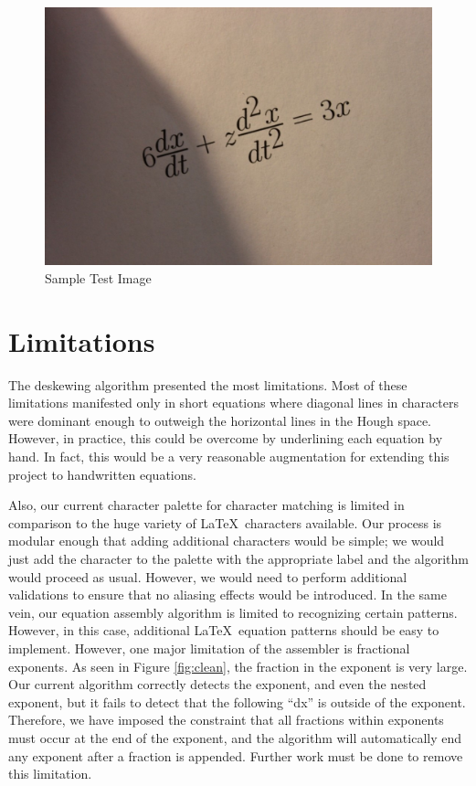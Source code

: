 \documentclass[journal]{IEEEtran}
\begin{document}
\begin{figure}[!t]
    \centering
    \includegraphics[width=\columnwidth]{test_img}
    \caption{Sample Test Image}
    \label{fig:test_img}
\end{figure}

\section{Limitations}
The deskewing algorithm presented the most limitations. Most of these limitations manifested only in short equations where diagonal lines in characters were dominant enough to outweigh the horizontal lines in the Hough space. However, in practice, this could be overcome by underlining each equation by hand. In fact, this would be a very reasonable augmentation for extending this project to handwritten equations.  

Also, our current character palette for character matching is limited in comparison to the huge variety of \LaTeX\ characters available. Our process is modular enough that adding additional characters would be simple; we would just add the character to the palette with the appropriate label and the algorithm would proceed as usual. However, we would need to perform additional validations to ensure that no aliasing effects would be introduced. In the same vein, our equation assembly algorithm is limited to recognizing certain patterns. However, in this case, additional \LaTeX\ equation patterns should be easy to implement.
However, one major limitation of the assembler is fractional exponents. As seen in Figure \ref{fig:clean}, the fraction in the exponent is very large. Our current algorithm correctly detects the exponent, and even the nested exponent, but it fails to detect that the following “dx” is outside of the exponent. Therefore, we have imposed the constraint that all fractions within exponents must occur at the end of the exponent, and the algorithm will automatically end any exponent after a fraction is appended. Further work must be done to remove this limitation.
\end{document}
